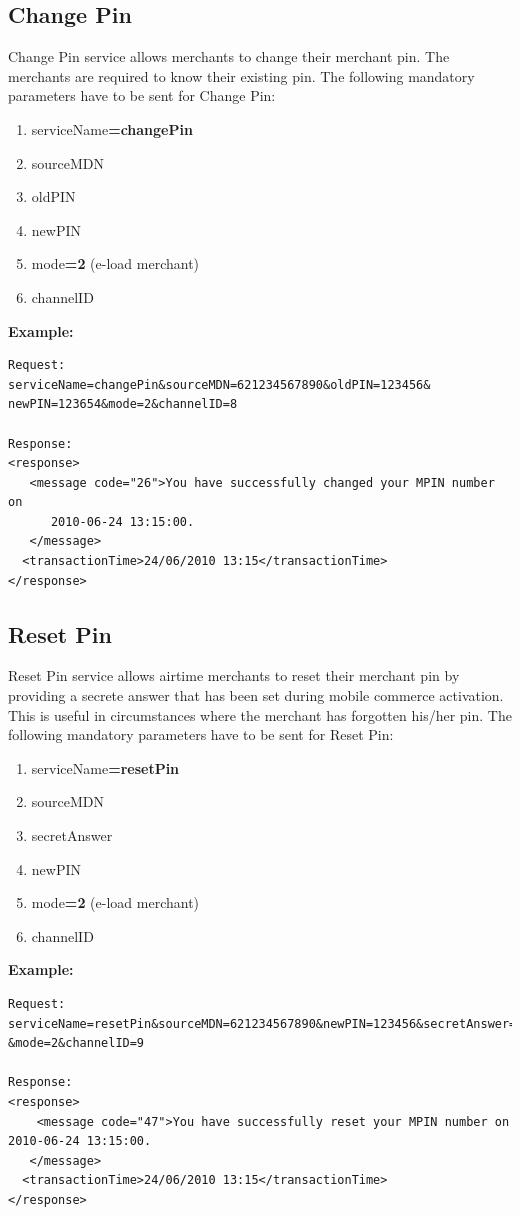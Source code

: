 \documentclass[11pt,titlepage]{article}
\begin{document}
\subsection{Change Pin}
Change Pin service allows merchants to change their merchant pin. The merchants are required to know their existing pin.
The following mandatory parameters have to be sent for Change Pin:
\begin{enumerate}
\item serviceName\textbf{=changePin}
\item sourceMDN
\item oldPIN
\item newPIN
\item mode\textbf{=2} (e-load merchant)
\item channelID
\end{enumerate}
\textbf{Example:}
\begin{verbatim}
Request:
serviceName=changePin&sourceMDN=621234567890&oldPIN=123456&
newPIN=123654&mode=2&channelID=8

Response:
<response>
   <message code="26">You have successfully changed your MPIN number on 
      2010-06-24 13:15:00.
   </message>
  <transactionTime>24/06/2010 13:15</transactionTime>
</response>
\end{verbatim}

\subsection{Reset Pin}
Reset Pin service allows airtime merchants to reset their merchant pin by providing a secrete answer that has been set during mobile commerce activation. This is useful in circumstances where the merchant has forgotten his/her pin.
The following mandatory parameters have to be sent for Reset Pin:
\begin{enumerate}
\item serviceName\textbf{=resetPin}
\item	sourceMDN
\item secretAnswer
\item newPIN
\item mode\textbf{=2} (e-load merchant)
\item channelID
\end{enumerate}
\textbf{Example:}
\begin{verbatim}
Request:
serviceName=resetPin&sourceMDN=621234567890&newPIN=123456&secretAnswer=12000
&mode=2&channelID=9

Response:
<response>
	<message code="47">You have successfully reset your MPIN number on 
2010-06-24 13:15:00.
   </message>
  <transactionTime>24/06/2010 13:15</transactionTime>
</response>
\end{verbatim}
\end{document}
